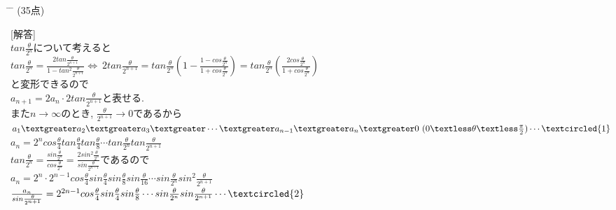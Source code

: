 \documentclass{article}
\begin{document}
\newpage
\begin{tabbing}
\hspace{0.91\textwidth} \= \hspace{0.8\textwidth} \= \kill
\textsf{}\> (35点)\>\\
\end{tabbing}
[{\large 解答}]\vspace{0.1in}\\
$tan\frac{\theta}{2^n}$について考えると\vspace{0.1in}\\
$tan\frac{\theta}{2^n}=\frac{2tan\frac{\theta}{2^{n+1}}}{1-tan^2\frac{\theta}{2^{n+1}}} \Leftrightarrow\ 2tan\frac{\theta}{2^{n+1}}=tan\frac{\theta}{2^n}(1-\frac{1-cos\frac{\theta}{2^n}}{1+cos\frac{\theta}{2^n}})=tan\frac{\theta}{2^n}(\frac {2cos\frac{\theta}{2^n}}{1+cos\frac{\theta}{2^n}})$\vspace{0.1in}\\
と変形できるので\vspace{0.1in}\\
$a_{n+1}=2a_n\cdot2tan\frac{\theta}{2^{n+1}}$と表せる.\vspace{0.1in}\\
また$\displaystyle n \rightarrow \infty$のとき, $\frac{\theta}{2^{n+1}} \rightarrow 0$であるから\vspace{0.1in}\\
$a_1 \textgreater a_2 \textgreater a_3\textgreater \cdots \textgreater a_{n-1} \textgreater a_n \textgreater 0\ (0\textless \theta \textless \frac{\pi}{2})\cdots \textcircled{1}$\vspace{0.1in}\\
$a_n=2^ncos\frac{\theta}{4}tan\frac{\theta}{4}tan\frac{\theta}{8}\cdots tan\frac{\theta}{2^n}tan\frac{\theta}{2^{n+1}}$\vspace{0.1in}\\
$tan\frac{\theta}{2^n}=\frac{sin\frac{\theta}{2^n}}{cos\frac{\theta}{2^n}}=\frac{2sin^2\frac{\theta}{2^n}}{sin\frac{\theta}{2^{n-1}}}$であるので\vspace{0.1in}\\
$a_n=2^n\cdot 2^{n-1}cos\frac{\theta}{4}sin\frac{\theta}{4}sin\frac{\theta}{8}sin\frac{\theta}{16}\cdots sin\frac{\theta}{2^n}sin^2\frac{\theta}{2^{n+1}}$\vspace{0.1in}\\
$\frac{a_n}{sin\frac{\theta}{2^{n+1}}}=2^{2n-1}cos\frac{\theta}{4}sin\frac{\theta}{4}sin\frac{\theta}{8}\cdots sin\frac{\theta}{2^n}sin\frac{\theta}{2^{n+1}}\cdots \textcircled{2}$\vspace{0.1in}\\
\end{document}

